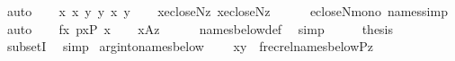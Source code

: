 \begin{isabellebody}
\ auto\isanewline
\ \ \isamarkupfalse%
\ {\isacartoucheopen}x{}{\isasymin}{\isacharunderscore}{\kern0pt}{\isacartoucheclose}\ {\isacartoucheopen}x{}{\isasymin}{\isacharunderscore}{\kern0pt}{\isacartoucheclose}\ {\isacartoucheopen}y{}{\isasymin}{\isacharunderscore}{\kern0pt}{\isacartoucheclose}\ {\isacartoucheopen}y{}{\isasymin}{\isacharunderscore}{\kern0pt}{\isacartoucheclose}\ {\isacartoucheopen}x{\isacharequal}{\kern0pt}{\isacharunderscore}{\kern0pt}{\isacartoucheclose}\ {\isacartoucheopen}y{\isacharequal}{\kern0pt}{\isacharunderscore}{\kern0pt}{\isacartoucheclose}\isanewline
\ \ \isamarkupfalse%
\ {\isachardoublequoteopen}x{}{\isasymin}ecloseN{\isacharparenleft}{\kern0pt}z{\isacharparenright}{\kern0pt}{\isachardoublequoteclose}\ {\isachardoublequoteopen}x{}{\isasymin}ecloseN{\isacharparenleft}{\kern0pt}z{\isacharparenright}{\kern0pt}{\isachardoublequoteclose}\isanewline
\ \ \ \ \isamarkupfalse%
\ ecloseN{\isacharunderscore}{\kern0pt}mono\ names{\isacharunderscore}{\kern0pt}simp\ \isamarkupfalse%
\ auto\isanewline
\ \ \isamarkupfalse%
\ {\isacartoucheopen}fx{\isasymin}{}{\isacartoucheclose}\ {\isacartoucheopen}px{\isasymin}P{\isacartoucheclose}\ {\isacartoucheopen}x{\isacharequal}{\kern0pt}{\isacharunderscore}{\kern0pt}{\isacartoucheclose}\isanewline
\ \ \isamarkupfalse%
\ {\isachardoublequoteopen}x{\isasymin}{\isacharquery}{\kern0pt}A{\isacharparenleft}{\kern0pt}z{\isacharparenright}{\kern0pt}{\isachardoublequoteclose}\isanewline
\ \ \ \ \isamarkupfalse%
\ names{\isacharunderscore}{\kern0pt}below{\isacharunderscore}{\kern0pt}def\ \isamarkupfalse%
\ simp\isanewline
\ \ \isamarkupfalse%
\ \isamarkupfalse%
\ {\isacharquery}{\kern0pt}thesis\ \isamarkupfalse%
\ subsetI\ \isamarkupfalse%
\ simp\isanewline
{}\isamarkupfalse%
%
\endisatagproof
{\isafoldproof}%
%
\isadelimproof
\isanewline
%
\endisadelimproof
\isanewline
{}\isamarkupfalse%
\ arg{\isacharunderscore}{\kern0pt}into{\isacharunderscore}{\kern0pt}names{\isacharunderscore}{\kern0pt}below{}\ {\isacharcolon}{\kern0pt}\isanewline
\ \ \ {\isachardoublequoteopen}{\isasymlangle}x{\isacharcomma}{\kern0pt}y{\isasymrangle}\ {\isasymin}\ frecrel{\isacharparenleft}{\kern0pt}names{\isacharunderscore}{\kern0pt}below{\isacharparenleft}{\kern0pt}P{\isacharcomma}{\kern0pt}z{\isacharparenright}{\kern0pt}{\isacharparenright}{\kern0pt}{\isachardoublequoteclose}\isanewline

\end{isabellebody}
